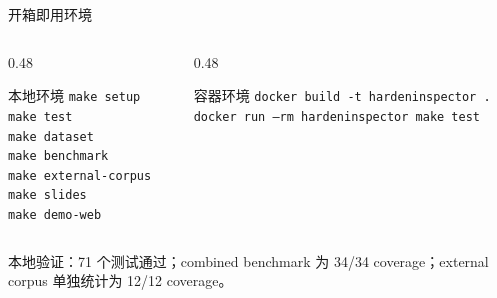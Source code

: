 \documentclass[10pt,aspectratio=169]{beamer}
\begin{document}
\begin{frame}{开箱即用环境}
  \begin{columns}[T,totalwidth=\textwidth]
    \begin{column}{0.48\textwidth}
      \begin{block}{本地环境}
        \scriptsize
        \texttt{make setup}\\
        \texttt{make test}\\
        \texttt{make dataset}\\
        \texttt{make benchmark}\\
        \texttt{make external-corpus}\\
        \texttt{make slides}\\
        \texttt{make demo-web}
      \end{block}
    \end{column}
    \begin{column}{0.48\textwidth}
      \begin{block}{容器环境}
        \scriptsize
        \texttt{docker build -t hardeninspector .}\\
        \texttt{docker run --rm hardeninspector make test}
      \end{block}
    \end{column}
  \end{columns}
  \vspace{0.7em}
  本地验证：71 个测试通过；combined benchmark 为 34/34 coverage；external corpus 单独统计为 12/12 coverage。
\end{frame}
\end{document}
